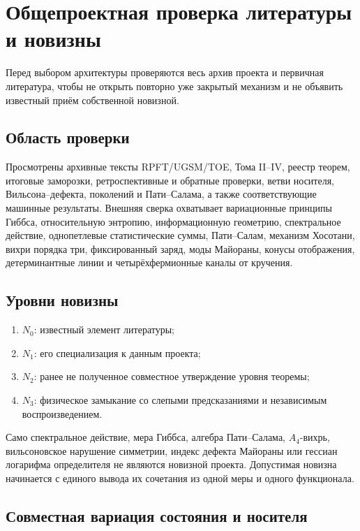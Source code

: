\chapter{Общепроектная проверка литературы и новизны}

Перед выбором архитектуры проверяются весь архив проекта и первичная
литература, чтобы не открыть повторно уже закрытый механизм и не объявить
известный приём собственной новизной.

\section{Область проверки}

Просмотрены архивные тексты RPFT/UGSM/TOE, Тома II--IV, реестр теорем,
итоговые заморозки, ретроспективные и обратные проверки, ветви носителя,
Вильсона--дефекта, поколений и Пати--Салама, а также соответствующие
машинные результаты. Внешняя сверка охватывает вариационные принципы Гиббса,
относительную энтропию, информационную геометрию, спектральное действие,
однопетлевые статистические суммы, Пати--Салам, механизм Хосотани,
вихри порядка три, фиксированный заряд, моды Майораны, конусы отображения,
детерминантные линии и четырёхфермионные каналы от кручения.

\section{Уровни новизны}

\begin{definition}
\begin{enumerate}
 \item \(N_0\): известный элемент литературы;
 \item \(N_1\): его специализация к данным проекта;
 \item \(N_2\): ранее не полученное совместное утверждение уровня теоремы;
 \item \(N_3\): физическое замыкание со слепыми предсказаниями и независимым
 воспроизведением.
\end{enumerate}
\end{definition}

Само спектральное действие, мера Гиббса, алгебра Пати--Салама,
\(A_4\)-вихрь, вильсоновское нарушение симметрии, индекс дефекта Майораны
или гессиан логарифма определителя не являются новизной проекта. Допустимая
новизна начинается с единого вывода их сочетания из одной меры и одного
функционала.

\section{Совместная вариация состояния и носителя}


